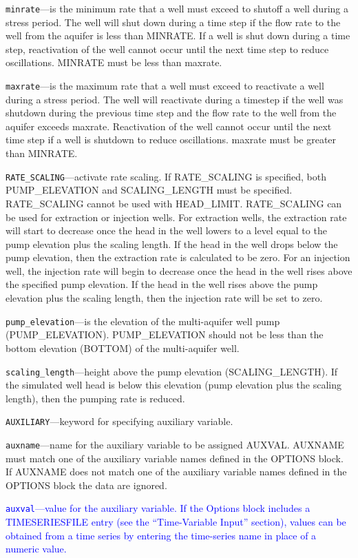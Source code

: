\begin{description}
\item \texttt{minrate}---is the minimum rate that a well must exceed to shutoff a well during a stress period. The well will shut down during a time step if the flow rate to the well from the aquifer is less than MINRATE. If a well is shut down during a time step, reactivation of the well cannot occur until the next time step to reduce oscillations. MINRATE must be less than maxrate.

\item \texttt{maxrate}---is the maximum rate that a well must exceed to reactivate a well during a stress period. The well will reactivate during a timestep if the well was shutdown during the previous time step and the flow rate to the well from the aquifer exceeds maxrate. Reactivation of the well cannot occur until the next time step if a well is shutdown to reduce oscillations. maxrate must be greater than MINRATE.

\item \texttt{RATE\_SCALING}---activate rate scaling.  If RATE\_SCALING is specified, both PUMP\_ELEVATION and SCALING\_LENGTH must be specified. RATE\_SCALING cannot be used with HEAD\_LIMIT.  RATE\_SCALING can be used for extraction or injection wells.  For extraction wells, the extraction rate will start to decrease once the head in the well lowers to a level equal to the pump elevation plus the scaling length.  If the head in the well drops below the pump elevation, then the extraction rate is calculated to be zero.  For an injection well, the injection rate will begin to decrease once the head in the well rises above the specified pump elevation.  If the head in the well rises above the pump elevation plus the scaling length, then the injection rate will be set to zero.

\item \texttt{pump\_elevation}---is the elevation of the multi-aquifer well pump (PUMP\_ELEVATION).  PUMP\_ELEVATION should not be less than the bottom elevation (BOTTOM) of the multi-aquifer well.

\item \texttt{scaling\_length}---height above the pump elevation (SCALING\_LENGTH).  If the simulated well head is below this elevation (pump elevation plus the scaling length), then the pumping rate is reduced.

\item \texttt{AUXILIARY}---keyword for specifying auxiliary variable.

\item \texttt{auxname}---name for the auxiliary variable to be assigned AUXVAL.  AUXNAME must match one of the auxiliary variable names defined in the OPTIONS block. If AUXNAME does not match one of the auxiliary variable names defined in the OPTIONS block the data are ignored.

\item \textcolor{blue}{\texttt{auxval}---value for the auxiliary variable. If the Options block includes a TIMESERIESFILE entry (see the ``Time-Variable Input'' section), values can be obtained from a time series by entering the time-series name in place of a numeric value.}

\end{description}

